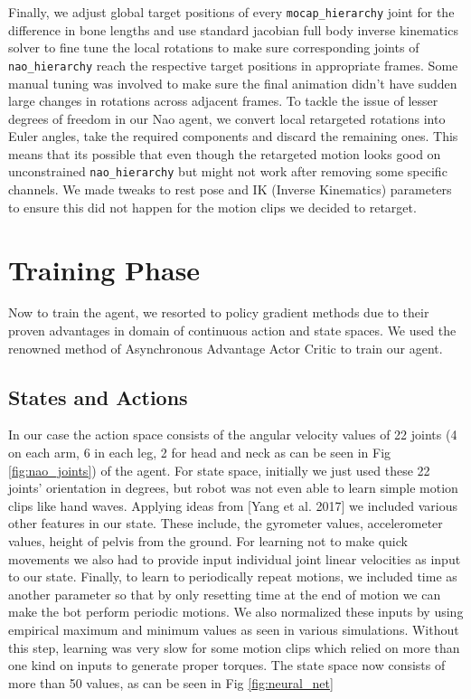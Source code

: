 Finally, we adjust global target positions of every \texttt{mocap\_hierarchy} joint for the difference in bone lengths and use standard jacobian full body inverse kinematics solver to fine tune the local rotations to make sure corresponding joints of \texttt{nao\_hierarchy} reach the respective target positions in appropriate frames. Some manual tuning was involved to make sure the final animation didn't have sudden large changes in rotations across adjacent frames.
To tackle the issue of lesser degrees of freedom in our Nao agent, we convert local retargeted rotations into Euler angles, take the required components and discard the remaining ones. This means that its possible that even though the retargeted motion looks good on unconstrained \texttt{nao\_hierarchy} but might not work after removing some specific channels. We made tweaks to rest pose and IK (Inverse Kinematics) parameters to ensure this did not happen for the motion clips we decided to retarget. 
  
\section{Training Phase} 
Now to train the agent, we resorted to policy gradient methods due to their proven advantages in domain of continuous action and state spaces. We used the renowned method of Asynchronous Advantage Actor Critic \cite{mnih2016asynchronous} to train our agent.

\subsection{States and Actions}
In our case the action space consists of the angular velocity values of 22 joints (4 on each arm, 6 in each leg, 2 for head and neck as can be seen in Fig \ref{fig:nao_joints}) of the agent. For state space, initially we just used these 22 joints' orientation in degrees, but robot was not even able to learn simple motion clips like hand waves. Applying ideas from  [Yang et al. 2017] \cite{yang2017emergence} we included various other features in our state. These include, the gyrometer values, accelerometer values, height of pelvis from the ground. For learning not to make quick movements we also had to provide input individual joint linear velocities as input to our state. Finally, to learn to periodically repeat motions, we included time as another parameter so that by only resetting time at the end of motion we can make the bot perform periodic motions. We also normalized these inputs by using empirical maximum and minimum values as seen in various simulations. Without this step, learning was very slow for some motion clips which relied on more than one kind on inputs to generate proper torques. The state space now consists of more than 50 values, as can be seen in Fig \ref{fig:neural_net}   

